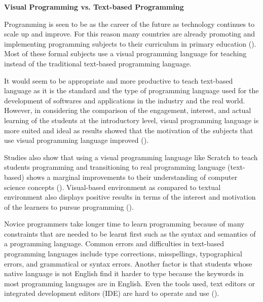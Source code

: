 \flushleft
\textbf{Visual Programming vs. Text-based Programming}\\
\justifying

\parx
Programming is seen to be as the career of the future as technology continues to scale
up and improve. For this reason many countries are already promoting and implementing
programming subjects to their curriculum in primary education
(\cite{williams_alafghani_daley_gregory_rydzewski_2015}). Most of these formal subjects
use a visual programming language for teaching instead of the traditional text-based
programming language.

\parx
It would seem to be appropriate and more productive to teach
text-based language as it is the standard and the type of programming language used for
the development of softwares and applications in the industry and the real world.
However, in considering the comparison of the engagement, interest, and actual learning
of the students at the introductory level, visual programming language is more suited
and ideal as results showed that the motivation of the subjects that use visual
programming language improved (\cite{tsukamoto_2016}).

\parx
Studies also show that using a visual programming language like Scratch to teach
students programming and transitioning to real programming language (text-based) shows
a marginal improvements to their understanding of computer science concepts
(\cite{armoni_2015}). Visual-based environment as compared to textual
environment also displays positive results in terms of the interest and motivation of
the learners to pursue programming (\cite{daisuke_2017}).

\parx
Novice programmers take longer time to learn programming because of many constraints
that are needed to be learnt first such as the syntax and semantics of a programming
language. Common errors and difficulties in text-based programming languages include
type corrections, misspellings, typographical errors, and grammatical or syntax errors.
Another factor is that students whose native language is not English find it harder
to type because the keywords in most programming languages are in English. Even the
tools used, text editors or integrated development editors (IDE) are hard to operate
and use (\cite{liu_wu_dong_2010}).
